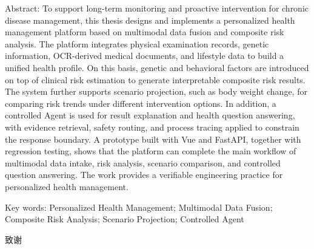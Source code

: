 \documentclass[UTF8, a4paper, 12pt, oneside]{ctexrep}
\newcommand{\songbffamily}{\CJKfamily{songbf}}
\numberwithin{equation}{chapter}
\begin{document}
{\rmfamily{}
\noindent Abstract: To support long-term monitoring and proactive intervention for chronic disease management, this thesis designs and implements a personalized health management platform based on multimodal data fusion and composite risk analysis. The platform integrates physical examination records, genetic information, OCR-derived medical documents, and lifestyle data to build a unified health profile. On this basis, genetic and behavioral factors are introduced on top of clinical risk estimation to generate interpretable composite risk results. The system further supports scenario projection, such as body weight change, for comparing risk trends under different intervention options. In addition, a controlled Agent is used for result explanation and health question answering, with evidence retrieval, safety routing, and process tracing applied to constrain the response boundary. A prototype built with Vue and FastAPI, together with regression testing, shows that the platform can complete the main workflow of multimodal data intake, risk analysis, scenario comparison, and controlled question answering. The work provides a verifiable engineering practice for personalized health management.
\par}

{\rmfamily{}
\noindent Key words: Personalized Health Management; Multimodal Data Fusion; Composite Risk Analysis; Scenario Projection; Controlled Agent\par}
\newpage

\clearpage









\clearpage
\begingroup
\renewcommand{\bibsection}{%
    \phantomsection
    \addcontentsline{toc}{chapter}{参考文献}%
    {\noindent\songbffamily\zihao{-4} 参考文献:\par}%
    \vspace{0.5\baselineskip}%
}
\setlength{\bibsep}{0pt}
\setlength{\bibhang}{0pt}
\singlespacing
\songti\rmfamily{}
\sloppy

\endgroup

\clearpage
{}
{}
\begin{center}
{\songbffamily{} 致\quad 谢\par}
\end{center}
\vspace{0.5\baselineskip}
\end{document}
